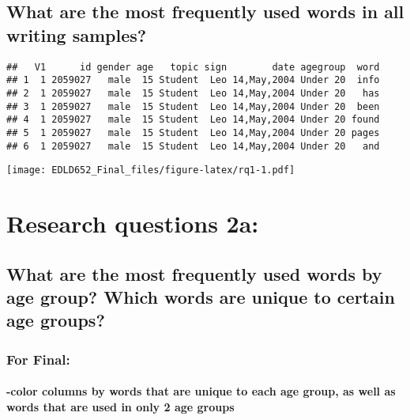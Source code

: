 \documentclass[
]{article}
\begin{document}
\hypertarget{what-are-the-most-frequently-used-words-in-all-writing-samples}{%
\subsection{What are the most frequently used words in all writing
samples?}\label{what-are-the-most-frequently-used-words-in-all-writing-samples}}

\begin{verbatim}
##   V1      id gender age   topic sign        date agegroup  word
## 1  1 2059027   male  15 Student  Leo 14,May,2004 Under 20  info
## 2  1 2059027   male  15 Student  Leo 14,May,2004 Under 20   has
## 3  1 2059027   male  15 Student  Leo 14,May,2004 Under 20  been
## 4  1 2059027   male  15 Student  Leo 14,May,2004 Under 20 found
## 5  1 2059027   male  15 Student  Leo 14,May,2004 Under 20 pages
## 6  1 2059027   male  15 Student  Leo 14,May,2004 Under 20   and
\end{verbatim}

\texttt{[image: EDLD652\_Final\_files/figure-latex/rq1-1.pdf]}

\hypertarget{research-questions-2a}{%
\section{Research questions 2a:}\label{research-questions-2a}}

\hypertarget{what-are-the-most-frequently-used-words-by-age-group-which-words-are-unique-to-certain-age-groups}{%
\subsection{What are the most frequently used words by age group? Which
words are unique to certain age
groups?}\label{what-are-the-most-frequently-used-words-by-age-group-which-words-are-unique-to-certain-age-groups}}

\hypertarget{for-final}{%
\subsubsection{For Final:}\label{for-final}}

\hypertarget{color-columns-by-words-that-are-unique-to-each-age-group-as-well-as-words-that-are-used-in-only-2-age-groups}{%
\paragraph{-color columns by words that are unique to each age group, as
well as words that are used in only 2 age
groups}\label{color-columns-by-words-that-are-unique-to-each-age-group-as-well-as-words-that-are-used-in-only-2-age-groups}}
\end{document}
